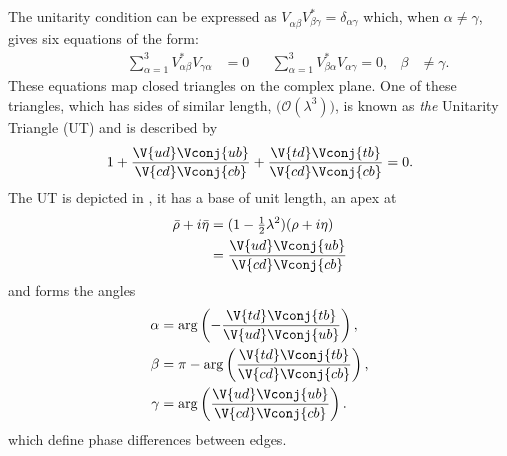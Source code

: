 The unitarity condition can be expressed as
$V_{\alpha\beta}^{\phantom{\dagger}}V_{\beta\gamma}^* = \delta_{\alpha\gamma}$
which, when $\alpha\neq\gamma$, gives six equations of the form:
\begin{align}
  \phantom{\beta\neq\gamma}&&\sum_{\alpha=1}^3V_{\alpha\beta}^*V_{\gamma\alpha}^{\phantom{*}} &= 0
  && \sum_{\alpha=1}^3V_{\beta\alpha}^*V_{\alpha\gamma}^{\phantom{*}}=0, & \beta&\neq\gamma.
  \label{eq:th:offdiag}
\end{align}
These equations map closed triangles on the complex plane.
One of these triangles, which has sides of similar length,
$\big(\mathcal{O}(\lambda^3)\big)$,
is known as \emph{the} Unitarity Triangle (UT) and is described by
\begin{equation}
  1 + \frac{\V{ud}\Vconj{ub}}{\V{cd}\Vconj{cb}} + \frac{\V{td}\Vconj{tb}}{\V{cd}\Vconj{cb}} = 0.
  \label{eq:th:ut}
\end{equation}
The UT is depicted in , it has a base of unit length, an apex at
\begin{align}
  \bar\rho+i\bar\eta &= (1-\tfrac12\lambda^2)(\rho+i\eta) \nonumber\\
  &=\frac{\V{ud}\Vconj{ub}}{\V{cd}\Vconj{cb}}
\end{align}
and forms the angles
\begin{align}
  \alpha &=    \arg\left(-\frac{\V{td}\Vconj{tb}}{\V{ud}\Vconj{ub}}\right), \nonumber\\
  \beta  &=\pi-\arg\left( \frac{\V{td}\Vconj{tb}}{\V{cd}\Vconj{cb}}\right), \nonumber\\
  \gamma &=    \arg\left( \frac{\V{ud}\Vconj{ub}}{\V{cd}\Vconj{cb}}\right).
\end{align}
which define phase differences between edges.

